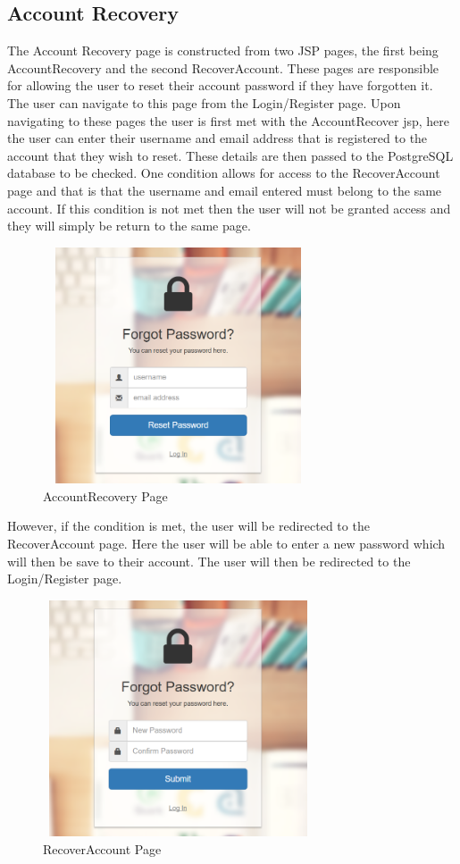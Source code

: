 \subsection{Account Recovery}
The Account Recovery page is constructed from two JSP pages, the first being AccountRecovery and the second RecoverAccount. These pages are responsible for allowing the user to reset their account password if they have forgotten it. The user can navigate to this page from the Login/Register page. Upon navigating to these pages the user is first met with the AccountRecover jsp, here the user can enter their username and email address that is registered to the account that they wish to reset. These details are then passed to the PostgreSQL database to be checked. One condition allows for access to the RecoverAccount page and that is that the username and email entered must belong to the same account. If this condition is not met then the user will not be granted access and they will simply be return to the same page.

\begin{figure}[h]
\centering
\includegraphics[width=8cm, height=7cm]{img/AccountRecovery}
\caption{AccountRecovery Page}
\label{fig:AccountRecovery}
\end{figure}

However, if the condition is met, the user will be redirected to the RecoverAccount page. Here the user will be able to enter a new password which will then be save to their account. The user will then be redirected to the Login/Register page.

\begin{figure}[h]
\centering
\includegraphics[width=8cm, height=7cm]{img/RecoverAccount}
\caption{RecoverAccount Page}
\label{fig:RecoverAccount}
\end{figure}
\newpage

